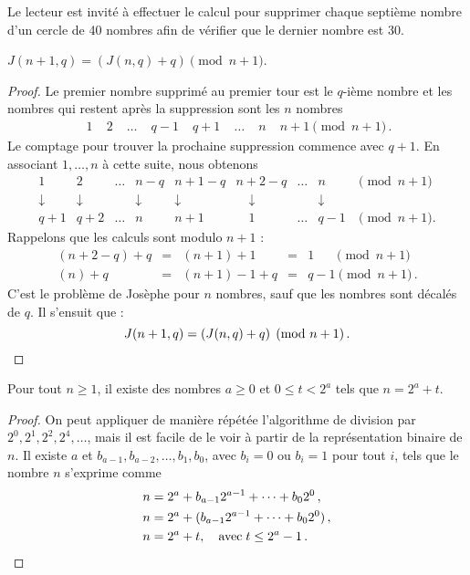 Le lecteur est invité à effectuer le calcul pour supprimer chaque septième nombre d'un cercle de 40 nombres afin de vérifier que le dernier nombre est 30.

\begin{theorem}\label{thm.jo1}
$J(n+1,q)=(J(n,q)+q) \pmod {n+1}$.
\end{theorem}

\begin{proof}
Le premier nombre supprimé au premier tour est le $q$-ième nombre et les nombres qui restent après la suppression sont les $n$ nombres 
\[
\begin{array}{rrrrrrrr}
\;1&\;2&\;\ldots&\;q-1&\;q+1&\;\ldots&\;n&\;n+1 \pmod {n+1}\,.
\end{array}
\]
Le comptage pour trouver la prochaine suppression commence avec $q+1$. En associant $1,\ldots,n$ à cette suite, nous obtenons 
\[
\begin{array}{ccccccccc}
1& 2&\ldots& n-q& n+1-q& n+2-q&\ldots& n& \!\!\!\!\!\!\!\!\!\!\!\!\!\!\pmod {n\!+\!1}\\
\downarrow& \downarrow&&\downarrow& \downarrow&\quad \downarrow&& \downarrow\\
q+1& q+2&\ldots&n& n+1&\quad 1&\ldots& q-1& \!\!\!\!\!\!\!\!\!\pmod {n\!+\!1}.
\end{array}
\]
Rappelons que les calculs sont modulo $n+1$ :
\[
\begin{array}{lclcl}
(n+2-q)+q&=& (n+1)+1&=& 1 \quad\;\;\pmod {n+1}\\
(n)+q&= &(n+1)-1+q&= &q-1\pmod {n+1}\,.
\end{array}
\]
C'est le problème de Josèphe pour $n$ nombres, sauf que les nombres sont décalés de $q$. Il s'ensuit que :
\[
J(n+1,q)=(J(n,q)+q) \pmod {n+1}\,.
\qedhere\]
\end{proof}

\begin{theorem}\label{lem.jo}
Pour tout $n\geq 1$, il existe des nombres $a\geq 0$ et $0\leq t < 2^a$  tels que $n=2^a+t$.
\end{theorem}
\begin{proof}
On peut appliquer de manière répétée 
 l'algorithme de division par $2^0, 2^1, 2^2, 2^4,\ldots$, mais il est facile de le voir à partir de la représentation binaire de $n$. Il existe  $a$ et $b_{a-1},b_{a-2},\ldots,b_{1},b_{0}$, avec  $b_i=0$ ou $b_i=1$  pour tout $i$, tels que le nombre $n$ s'exprime comme 
\begin{align*}
n&=2^a+b_{a-1}2^{a-1}+\cdots+b_{0}2^{0}\,,\\
n&=2^a+(b_{a-1}2^{a-1}+\cdots+b_{0}2^{0})\,,\\
n&=2^a+t,\quad \textrm{avec}\; t\leq 2^a-1\,.\qedhere
\end{align*}
\end{proof}


